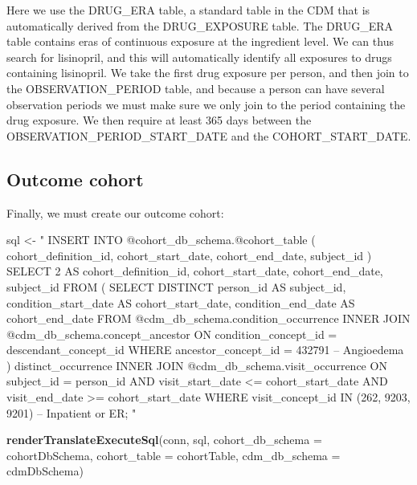 \documentclass[11pt]{book}
\newenvironment{Shaded}{\begin{snugshade}}{\end{snugshade}}
\newcommand{\DataTypeTok}[1]{\textcolor[rgb]{0.13,0.29,0.53}{#1}}
\newcommand{\KeywordTok}[1]{\textcolor[rgb]{0.13,0.29,0.53}{\textbf{#1}}}
\newcommand{\NormalTok}[1]{#1}
\newcommand{\StringTok}[1]{\textcolor[rgb]{0.31,0.60,0.02}{#1}}
\theoremstyle{definition}
\theoremstyle{definition}
\theoremstyle{definition}
\theoremstyle{remark}
\begin{document}
Here we use the DRUG\_ERA table, a standard table in the CDM that is automatically derived from the DRUG\_EXPOSURE table. The DRUG\_ERA table contains eras of continuous exposure at the ingredient level. We can thus search for lisinopril, and this will automatically identify all exposures to drugs containing lisinopril. We take the first drug exposure per person, and then join to the OBSERVATION\_PERIOD table, and because a person can have several observation periods we must make sure we only join to the period containing the drug exposure. We then require at least 365 days between the OBSERVATION\_PERIOD\_START\_DATE and the COHORT\_START\_DATE.

\hypertarget{outcome-cohort}{%
\subsection{Outcome cohort}\label{outcome-cohort}}

Finally, we must create our outcome cohort:

\begin{Shaded}
\begin{Highlighting}[]
\NormalTok{sql <-}\StringTok{ "}
\StringTok{INSERT INTO @cohort_db_schema.@cohort_table (}
\StringTok{ cohort_definition_id,}
\StringTok{ cohort_start_date,}
\StringTok{ cohort_end_date,}
\StringTok{subject_id}
\StringTok{)}
\StringTok{SELECT 2 AS cohort_definition_id,}
\StringTok{  cohort_start_date,}
\StringTok{  cohort_end_date,}
\StringTok{  subject_id}
\StringTok{FROM (}
\StringTok{  SELECT DISTINCT person_id AS subject_id,}
\StringTok{    condition_start_date AS cohort_start_date,}
\StringTok{    condition_end_date AS cohort_end_date}
\StringTok{  FROM @cdm_db_schema.condition_occurrence}
\StringTok{  INNER JOIN @cdm_db_schema.concept_ancestor}
\StringTok{    ON condition_concept_id = descendant_concept_id}
\StringTok{  WHERE ancestor_concept_id = 432791 -- Angioedema}
\StringTok{) distinct_occurrence}
\StringTok{INNER JOIN @cdm_db_schema.visit_occurrence}
\StringTok{  ON subject_id = person_id}
\StringTok{  AND visit_start_date <= cohort_start_date}
\StringTok{  AND visit_end_date >= cohort_start_date}
\StringTok{WHERE visit_concept_id IN (262, 9203,}
\StringTok{    9201) -- Inpatient or ER;}
\StringTok{"}

\KeywordTok{renderTranslateExecuteSql}\NormalTok{(conn, sql,}
                          \DataTypeTok{cohort_db_schema =}\NormalTok{ cohortDbSchema,}
                          \DataTypeTok{cohort_table =}\NormalTok{ cohortTable,}
                          \DataTypeTok{cdm_db_schema =}\NormalTok{ cdmDbSchema)}
\end{Highlighting}
\end{Shaded}
\end{document}
